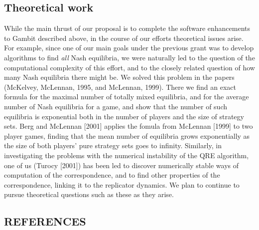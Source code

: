 \documentclass[12pt]{article}
\begin{document}
\subsection{Theoretical work}

While the main thrust of our proposal is to complete the software
enhancements to Gambit described above, in the course of our efforts
theoretical issues arise.  For example, since one of our main goals
under the previous grant was to develop algorithms to find {\it all}
Nash equilibria, we were naturally led to the question of the
computational complexity of this effort, and to the closely related
question of how many Nash equilibria there might be.  We solved this
problem in the papers (McKelvey, McLennan, 1995, and McLennan, 1999).
There we find an exact formula for the maximal number of totally mixed
equilibria, and for the average number of Nash equilibria for a game,
and show that the number of such equilibria is exponential both in the
number of players and the size of strategy sets.  Berg and McLennan
[2001] applies the fomula from McLennan [1999] to two player games,
finding that the mean number of equilibria grows exponentially as the
size of both players' pure strategy sets goes to infinity.  Similarly, in
investigating the problems with the numerical instability of the QRE
algorithm, one of us (Turocy [2001]) has been led to discover numerically
stable ways of computation of the correspondence, and to find other
properties of the correspondence, linking it to the replicator
dynamics.  We plan to continue to pursue theoretical questions such
as these as they arise.

\newpage
\begin{center}
\section{\bf  REFERENCES }
\end{center}
\end{document}
